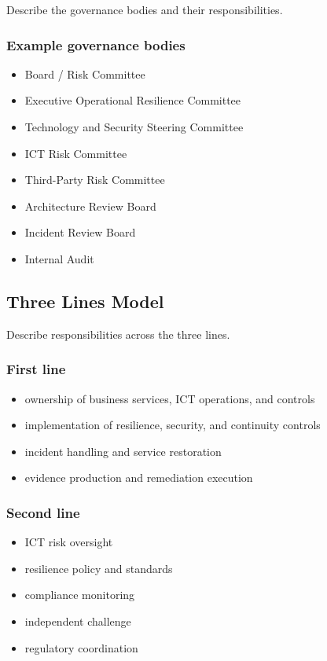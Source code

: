 \documentclass[
  letterpaper,
  DIV=11,
  numbers=noendperiod]{scrartcl}
\providecommand{\tightlist}{%
  \setlength{\itemsep}{0pt}\setlength{\parskip}{0pt}}
\begin{document}
Describe the governance bodies and their responsibilities.

\subsubsection{Example governance
bodies}\label{example-governance-bodies}

\begin{itemize}
\tightlist
\item
  Board / Risk Committee
\item
  Executive Operational Resilience Committee
\item
  Technology and Security Steering Committee
\item
  ICT Risk Committee
\item
  Third-Party Risk Committee
\item
  Architecture Review Board
\item
  Incident Review Board
\item
  Internal Audit
\end{itemize}

\subsection{Three Lines Model}\label{three-lines-model}

Describe responsibilities across the three lines.

\subsubsection{First line}\label{first-line}

\begin{itemize}
\tightlist
\item
  ownership of business services, ICT operations, and controls
\item
  implementation of resilience, security, and continuity controls
\item
  incident handling and service restoration
\item
  evidence production and remediation execution
\end{itemize}

\subsubsection{Second line}\label{second-line}

\begin{itemize}
\tightlist
\item
  ICT risk oversight
\item
  resilience policy and standards
\item
  compliance monitoring
\item
  independent challenge
\item
  regulatory coordination
\end{itemize}
\end{document}
